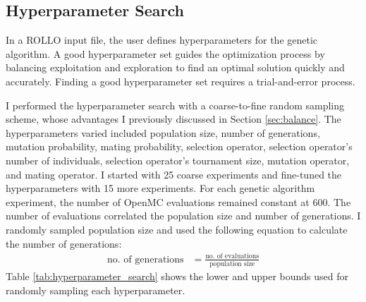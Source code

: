 \subsection{Hyperparameter Search}
\label{sec:hyperparameter_search}
In a \gls{ROLLO} input file, the user defines hyperparameters for the genetic 
algorithm.
A good hyperparameter set guides the optimization process by 
balancing exploitation and exploration to find an optimal solution quickly 
and accurately. 
Finding a good hyperparameter set requires a trial-and-error process. 

I performed the hyperparameter search with a coarse-to-fine random sampling scheme, 
whose advantages I previously discussed in Section \ref{sec:balance}.
The hyperparameters varied included population size, number of generations, 
mutation probability, mating probability, selection operator, selection operator's 
number of individuals, selection operator's tournament size, mutation operator, 
and mating operator.  
I started with 25 coarse experiments and fine-tuned the hyperparameters
with 15 more experiments. 
For each genetic algorithm experiment, the number of OpenMC evaluations remained
constant at 600.
The number of evaluations correlated the population size and number of generations. 
I randomly sampled population size and used the following equation to calculate 
the number of generations: 
\begin{align}
    \mbox{no. of generations} &= \frac{\mbox{no. of evaluations}}{\mbox{population size} }
\end{align}
Table \ref{tab:hyperparameter_search} shows the lower and upper bounds used 
for randomly sampling each hyperparameter.
